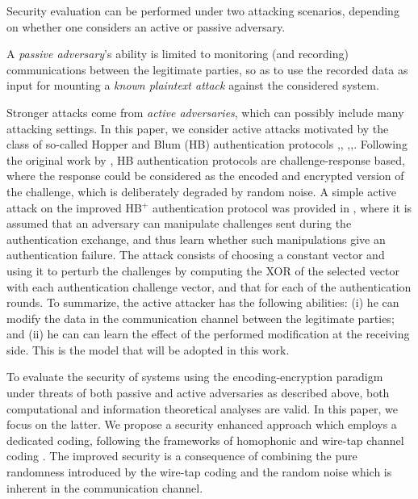 \documentclass{article}[11pt]
\begin{document}
Security evaluation can be performed under two attacking scenarios, depending
on whether one considers an active or passive adversary.

A {\em passive adversary}'s ability is limited to monitoring (and recording)
communications between the legitimate parties, so as to use the recorded data
as input for mounting a {\em known plaintext attack} against the considered
system.

Stronger attacks come from {\em active adversaries}, which can possibly
include many attacking settings. In this paper, we consider active attacks
motivated by the class of so-called Hopper and Blum (HB) authentication
protocols \cite{hopper-ASIACRYPT2001},\cite{juels-CRYPTO2005},
\cite{katz-EUROCRYPT2006},\cite{gilbert-EUROCRYPT2008},\cite{gilbert-FC2008}.
Following the original work by \cite{hopper-ASIACRYPT2001}, HB authentication
protocols are challenge-response based, where the response could be considered
as the encoded and encrypted version of the challenge, which is deliberately
degraded by random noise. A simple active attack on the improved HB$^+$
authentication protocol \cite{katz-EUROCRYPT2006} was provided in
\cite{gilbert}, where it is assumed that an adversary can manipulate
challenges sent during the authentication exchange, and thus learn whether
such manipulations give an authentication failure. The attack consists of
choosing a constant vector and using it to perturb the challenges by computing
the XOR of the selected vector with each authentication challenge vector, and
that for each of the authentication rounds. To summarize, the active attacker
has the following abilities: (i) he can modify the data in the communication
channel between the legitimate parties; and (ii) he can can learn the effect
of the performed modification at the receiving side.
This is the model that will be adopted in this work.

To evaluate the security of systems using the encoding-encryption
paradigm under threats of both passive and active adversaries as
described above, both computational and information theoretical
analyses are valid. In this paper, we focus on the latter. We
propose a security enhanced approach which employs a dedicated
coding, following the frameworks of homophonic \cite{jendal,
massey-1994, ryabko} and wire-tap channel coding
\cite{wyner,thangaraj-IEEE-IT-2007}. The improved security is a
consequence of combining the pure randomness introduced by the
wire-tap coding and the random noise which is inherent in the
communication channel.
\end{document}
